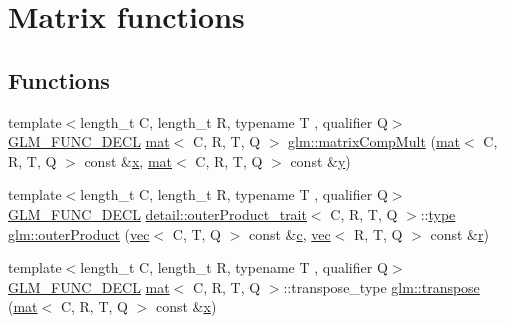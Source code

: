\hypertarget{group__core__func__matrix}{}\section{Matrix functions}
\label{group__core__func__matrix}
\subsection*{Functions}
\begin{DoxyCompactItemize}
\item 
{\footnotesize template$<$length\+\_\+t C, length\+\_\+t R, typename T , qualifier Q$>$ }\\\hyperlink{setup_8hpp_ab2d052de21a70539923e9bcbf6e83a51}{G\+L\+M\+\_\+\+F\+U\+N\+C\+\_\+\+D\+E\+CL} \hyperlink{structglm_1_1mat}{mat}$<$ C, R, T, Q $>$ \hyperlink{group__core__func__matrix_gaf14569404c779fedca98d0b9b8e58c1f}{glm\+::matrix\+Comp\+Mult} (\hyperlink{structglm_1_1mat}{mat}$<$ C, R, T, Q $>$ const \&\hyperlink{_s_d_l__opengl_8h_ad0e63d0edcdbd3d79554076bf309fd47}{x}, \hyperlink{structglm_1_1mat}{mat}$<$ C, R, T, Q $>$ const \&\hyperlink{_s_d_l__opengl_8h_a1675d9d7bb68e1657ff028643b4037e3}{y})
\item 
{\footnotesize template$<$length\+\_\+t C, length\+\_\+t R, typename T , qualifier Q$>$ }\\\hyperlink{setup_8hpp_ab2d052de21a70539923e9bcbf6e83a51}{G\+L\+M\+\_\+\+F\+U\+N\+C\+\_\+\+D\+E\+CL} \hyperlink{structglm_1_1detail_1_1outer_product__trait}{detail\+::outer\+Product\+\_\+trait}$<$ C, R, T, Q $>$\+::\hyperlink{structglm_1_1type}{type} \hyperlink{group__core__func__matrix_gac29fb7bae75a8e4c1b74cbbf85520e50}{glm\+::outer\+Product} (\hyperlink{structglm_1_1vec}{vec}$<$ C, T, Q $>$ const \&\hyperlink{_s_d_l__opengl__glext_8h_a1f2d7f8147412c43ba2303a56f97ee73}{c}, \hyperlink{structglm_1_1vec}{vec}$<$ R, T, Q $>$ const \&\hyperlink{_s_d_l__opengl_8h_a42ce7cdc612e53abee15043f80220d97}{r})
\item 
{\footnotesize template$<$length\+\_\+t C, length\+\_\+t R, typename T , qualifier Q$>$ }\\\hyperlink{setup_8hpp_ab2d052de21a70539923e9bcbf6e83a51}{G\+L\+M\+\_\+\+F\+U\+N\+C\+\_\+\+D\+E\+CL} \hyperlink{structglm_1_1mat}{mat}$<$ C, R, T, Q $>$\+::transpose\+\_\+type \hyperlink{group__core__func__matrix_gae679d841da8ce9dbcc6c2d454f15bc35}{glm\+::transpose} (\hyperlink{structglm_1_1mat}{mat}$<$ C, R, T, Q $>$ const \&\hyperlink{_s_d_l__opengl_8h_ad0e63d0edcdbd3d79554076bf309fd47}{x})
\item 

\end{DoxyCompactItemize}
